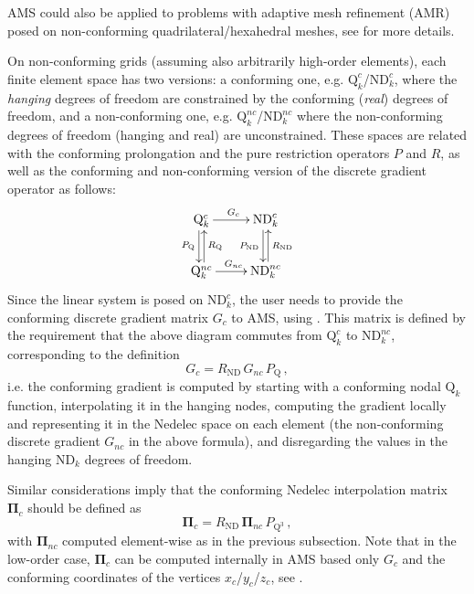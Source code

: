AMS could also be applied to problems with adaptive mesh refinement (AMR) posed
on non-conforming quadrilateral/hexahedral meshes, see \cite{ams_hpamr} for
more details.

On non-conforming grids (assuming also arbitrarily high-order elements), each
finite element space has two versions: a conforming one,
e.g. $\mathrm{Q}_k^{c}$/$\mathrm{ND}_k^c$, where the {\em hanging} degrees of
freedom are constrained by the conforming ({\em real}) degrees of freedom, and
a non-conforming one, e.g. $\mathrm{Q}_k^{nc}$/$\mathrm{ND}_k^{nc}$ where the
non-conforming degrees of freedom (hanging and real) are unconstrained.
These spaces are related with the conforming prolongation and the pure
restriction operators $P$ and $R$, as well as the conforming and non-conforming
version of the discrete gradient operator as follows:
$$
\xymatrix{
\mathrm{Q}_k^{c} \ar[r]^{G_{c}} \ar@<-2pt>[d]_{P_{\mathrm{Q}}} & \mathrm{ND}_k^c \ar@<-2pt>[d]_{P_{\mathrm{ND}}} \\
\mathrm{Q}_k^{nc} \ar[r]^{G_{nc}} \ar@<-2pt>[u]_{R_{\mathrm{Q}}} & \mathrm{ND}_k^{nc} \ar@<-2pt>[u]_{R_{\mathrm{ND}}}
}
$$
Since the linear system is posed on $\mathrm{ND}_k^c$, the user needs to provide
the conforming discrete gradient matrix $G_c$ to AMS, using 
.
This matrix is defined by the requirement that the above diagram commutes from
$\mathrm{Q}_k^{c}$ to $\mathrm{ND}_k^{nc}$, corresponding to the definition
$$
G_{c} = R_{\mathrm{ND}}\, G_{nc}\, P_{\mathrm{Q}} \,,
$$
i.e. the conforming gradient is computed by starting with a conforming nodal
$\mathrm{Q}_k$ function, interpolating it in the hanging nodes, computing the
gradient locally and representing it in the Nedelec space on each element (the
non-conforming discrete gradient $G_{nc}$ in the above formula), and
disregarding the values in the hanging $\mathrm{ND}_k$ degrees of freedom.

Similar considerations imply that the conforming Nedelec interpolation matrix
${\mathbf \Pi}_{c}$ should be defined as
$$
{\mathbf \Pi}_{c} = R_{\mathrm{ND}}\, {\mathbf \Pi}_{nc}\, P_{\mathrm{Q}^3} \,,
$$
with ${\mathbf \Pi}_{nc}$ computed element-wise as in the previous subsection. Note that
in the low-order case, ${\mathbf \Pi}_{c}$ can be computed internally in AMS based only
$G_c$ and the conforming coordinates of the vertices $x_c$/$y_c$/$z_c$, see
\cite{ams_hpamr}.



